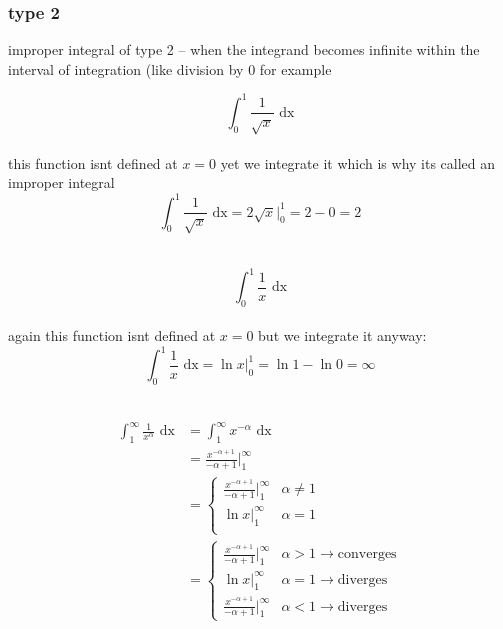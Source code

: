 \documentclass[a4paper,12pt]{article}
\newcommand{\?}{\stackrel{?}{=}}
\begin{document}
\subsubsection{type 2}
\label{sec:org05b4b67}
\begin{definition}
improper integral of type 2 – when the integrand becomes infinite within the interval of integration (like division by 0 for example\\[0pt]

\begin{my_example}
\[
  \int_0^1 \frac{1}{\sqrt{x}} \text{ dx}
\]\\[0pt]
this function isnt defined at \(x=0\) yet we integrate it which is why its called an improper integral\\[0pt]
\[
  \int_0^1 \frac{1}{\sqrt{x}} \text{ dx} = 2\sqrt{x} \Big|_0^1 = 2 - 0 = 2
\]\\[0pt]
\end{my_example}

\begin{my_example}
\[
  \int_0^1 \frac{1}{x} \text{ dx}
\]\\[0pt]
again this function isnt defined at \(x=0\) but we integrate it anyway:\\[0pt]
\[
  \int_0^1 \frac{1}{x} \text{ dx} = \ln{x} \Big|_0^1 = \ln{1} - \ln{0} = \infty
\]\\[0pt]
\end{my_example}

\begin{lemma}
\begin{align*}
  \int_1^\infty \frac{1}{x^\alpha} \text{ dx} &= \int_1^\infty x^{-\alpha} \text{ dx}\\
  &= \frac{x^{-\alpha+1}}{-\alpha+1} \bigg|_1^\infty\\
  &= \begin{cases}
       \frac{x^{-\alpha+1}}{-\alpha+1} \Big|_1^\infty &\alpha \neq 1\\
       \ln x \Big|_1^\infty &\alpha = 1\\
     \end{cases}\\
  &= \begin{cases}
       \frac{x^{-\alpha+1}}{-\alpha+1} \Big|_1^\infty &\alpha > 1 \rightarrow \text{converges}\\
       \ln x \Big|_1^\infty &\alpha = 1 \rightarrow \text{diverges}\\
       \frac{x^{-\alpha+1}}{-\alpha+1} \Big|_1^\infty &\alpha < 1 \rightarrow \text{diverges}
     \end{cases}
\end{align*}
\end{lemma}
\end{definition}
\end{document}
